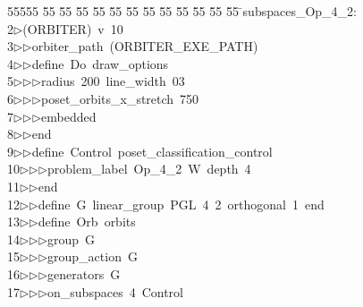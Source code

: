 %
%
\begin{tabbing}
55555 \= 55 \= 55 \= 55 \= 55 \= 55 \= 55 \= 55 \= 55 \= 55 \= 55 \= 55 \= 55 \= \>subspaces\_Op\_4\_2:\\[0pt]
2\>$\triangleright$\>(ORBITER)\ v\ 10\ \\[0pt]
3\>$\triangleright$\>$\triangleright$\>orbiter\_path\ (ORBITER\_EXE\_PATH)\ \\[0pt]
4\>$\triangleright$\>$\triangleright$\>define\ Do\ draw\_options\ \\[0pt]
5\>$\triangleright$\>$\triangleright$\>$\triangleright$\>radius\ 200\ line\_width\ 03\ \\[0pt]
6\>$\triangleright$\>$\triangleright$\>$\triangleright$\>poset\_orbits\_x\_stretch\ 750\ \\[0pt]
7\>$\triangleright$\>$\triangleright$\>$\triangleright$\>embedded\ \\[0pt]
8\>$\triangleright$\>$\triangleright$\>end\ \\[0pt]
9\>$\triangleright$\>$\triangleright$\>define\ Control\ poset\_classification\_control\ \\[0pt]
10\>$\triangleright$\>$\triangleright$\>$\triangleright$\>problem\_label\ Op\_4\_2\ W\ depth\ 4\ \\[0pt]
11\>$\triangleright$\>$\triangleright$\>end\ \\[0pt]
12\>$\triangleright$\>$\triangleright$\>define\ G\ linear\_group\ PGL\ 4\ 2\ orthogonal\ 1\ end\ \\[0pt]
13\>$\triangleright$\>$\triangleright$\>define\ Orb\ orbits\ \\[0pt]
14\>$\triangleright$\>$\triangleright$\>$\triangleright$\>group\ G\ \\[0pt]
15\>$\triangleright$\>$\triangleright$\>$\triangleright$\>group\_action\ G\ \\[0pt]
16\>$\triangleright$\>$\triangleright$\>$\triangleright$\>generators\ G\ \\[0pt]
17\>$\triangleright$\>$\triangleright$\>$\triangleright$\>on\_subspaces\ 4\ Control\ \\[0pt]

\end{tabbing}
